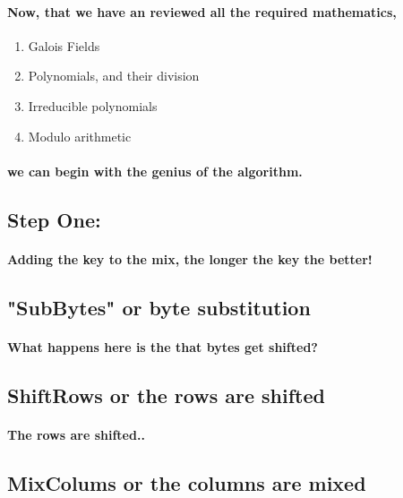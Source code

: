 \paragraph{Now, that we have an reviewed all the required mathematics,}

\begin{enumerate}
\item Galois Fields
\item Polynomials, and their division
\item Irreducible polynomials
\item Modulo arithmetic
\end{enumerate}

\paragraph{we can begin with the genius of the algorithm.}


\subsection{Step One:}
\paragraph{Adding the key to the mix, the longer the key the better!}


\subsection{"SubBytes" or byte substitution}
\paragraph{What happens here is the that bytes get shifted?}



\subsection{ShiftRows or the rows are shifted}
\paragraph{The rows are shifted..}


\subsection{MixColums or the columns are mixed}
